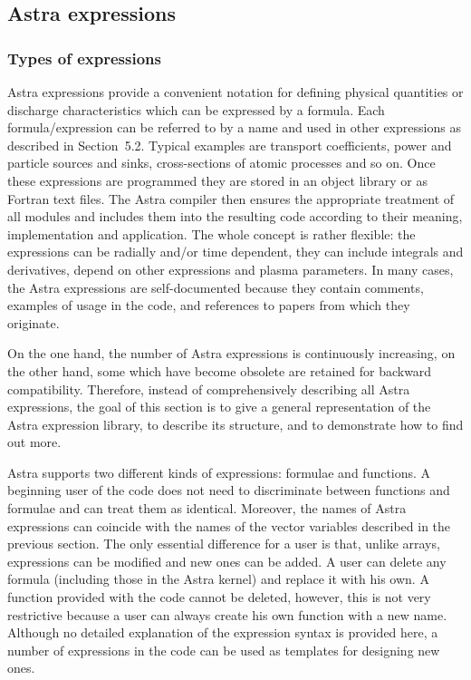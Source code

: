 \subsection{Astra expressions}

\subsubsection{Types of expressions}

Astra expressions provide a convenient notation for defining
physical quantities or discharge characteristics which can be expressed
by a formula. 
Each formula/expression can be referred to by a name and used in other
expressions as described in Section~5.2.
Typical examples are transport coefficients, power and particle sources
and sinks, cross-sections of atomic processes and so on.  
Once these expressions are programmed they are stored in an object
library or as Fortran text files.
The Astra compiler then ensures the appropriate treatment of all
modules and includes them into the resulting code according to their
meaning, implementation and application.
The whole concept is rather flexible: the expressions can be radially
and/or time dependent, they can include integrals and derivatives, depend
on other expressions and plasma parameters.
In many cases, the Astra expressions are self-documented because they
contain comments, examples of usage in the code, and references to 
papers from which they originate. 

On the one hand, the number of Astra expressions is continuously
increasing, on the other hand, some which have become obsolete are
retained for backward compatibility.
Therefore, instead of comprehensively describing all Astra expressions,
the goal of this section is to give a general representation of the Astra
expression library, to describe its structure, and to demonstrate how to 
find out more. 

Astra supports two different kinds of expressions:
formulae and functions. 
A beginning user of the code does not need to discriminate between
functions and formulae and can treat them as identical.
Moreover, the names of Astra expressions can coincide with the names of
the vector variables described in the previous section. 
The only essential difference for a user is that, unlike arrays,
expressions can be modified and new ones can be added. 
A user can delete any formula (including those in the Astra kernel) and
replace it with his own. 
A function provided with the code cannot be deleted, however, this is
not very restrictive because a user can always create his own function
with a new name.
Although no detailed explanation of the expression syntax is provided
here, a number of expressions in the code can be used as templates for
designing new ones. 

